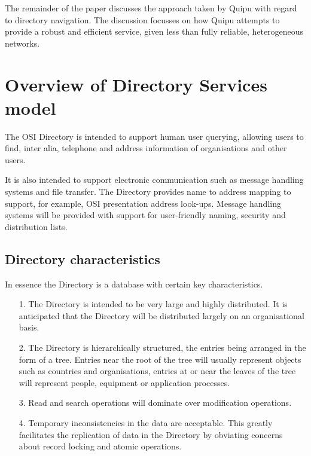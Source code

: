 The remainder of the paper discusses the approach taken by Quipu with regard
to directory navigation.  The discussion focusses on how Quipu attempts to
provide a robust and efficient service, given less than fully reliable,
heterogeneous networks.
\section{Overview of Directory Services model}

The OSI Directory is intended to support human user querying, allowing
users to find, inter alia, telephone and address information of
organisations and other users.  

It is also intended to support electronic
communication such as message handling systems and file transfer.
The Directory provides name to address mapping to support, for example, OSI
presentation address look-ups. Message handling systems will be provided with 
support for user-friendly naming, security and
distribution lists.
\subsection{Directory characteristics}

\begin{figure}
\begin{minipage}\columnwidth
\small
\relax\centerline{\box\graph}
\end{minipage}
\end{figure}

In essence the Directory is a database with certain key characteristics.
\begin{itemize}
\item[{1.}]
The Directory is intended to be very large and highly distributed. It is
anticipated that the Directory will be distributed largely on an
organisational basis.
\item[{2.}]
The Directory is hierarchically structured, the entries being arranged in
the form of a tree. Entries near the root of the tree will usually represent
objects such as countries and organisations, entries at or near the leaves
of the tree will represent people, equipment or application processes.
\item[{3.}]
Read and search operations will dominate over modification operations.
\item[{4.}]
Temporary inconsistencies in the data are acceptable.  This greatly
facilitates the replication of data in the Directory by obviating concerns
about record locking and atomic operations.
\end{itemize}
